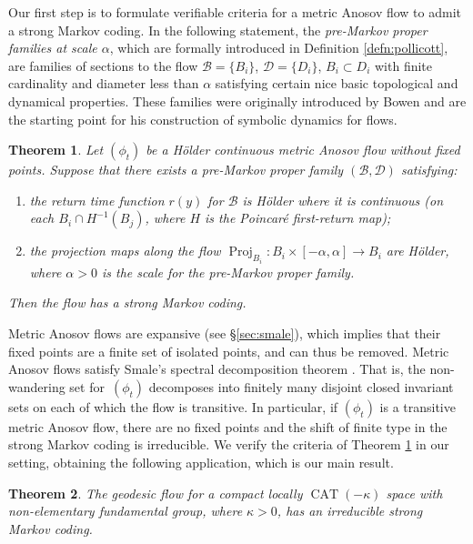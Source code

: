 \documentclass[JEP,XML,SOM,Unicode,NoFloatCountersInSection]{cedram}
\let\mathcal\mathscr
\newtheorem{thmx}{Theorem}
\theoremstyle{definition}
\numberwithin{equation}{section}
\DeclareMathOperator{\CAT}{CAT}
\DeclareMathOperator{\Proj}{Proj}
\newcommand\DDD{\mathcal D}
\newcommand\BBB{\mathcal B}
\begin{document}
Our first step is to formulate verifiable criteria for a metric Anosov flow to admit a strong Markov coding. In the following statement, the \emph{pre-Markov proper families at scale $\alpha$}, which are formally introduced in Definition \ref{defn:pollicott}, are families of sections to the flow $\BBB=\{B_i\}$, $\DDD=\{D_i\}$, $B_i \subset D_i$ with finite cardinality and diameter less than $\alpha$ satisfying certain nice basic topological and dynamical properties. These families were originally introduced by Bowen and are the starting point for his construction of symbolic dynamics for flows.
\begin{thmx} \label{t.usefulversion}
Let $(\phi_t)$ be a Hölder continuous metric Anosov flow without fixed points. Suppose that there exists a pre-Markov proper family $(\BBB, \DDD)$ satisfying:
\begin{enumerate}
\item\label{t.usefulversion1} the return time function $r(y)$ for $\BBB$ is Hölder where it is continuous (\ie on each $B_i \cap H^{-1}(B_j)$, where $H$ is the Poincaré first-return map);

\item\label{t.usefulversion2} the projection maps along the flow $\Proj_{B_{i}}: B_i \times [-\alpha, \alpha] \to B_i$ are Hölder, where $\alpha>0$ is the scale for the pre-Markov proper family.
\end{enumerate}
Then the flow has a strong Markov coding.
\end{thmx}
Metric Anosov flows are expansive (see \S \ref{sec:smale}), which implies that their fixed points are a finite set of isolated points, and can thus be removed. Metric Anosov flows satisfy Smale's spectral decomposition theorem \cite{pollicott}. That is, the non-wandering set for~$(\phi_t)$ decomposes into finitely many disjoint closed invariant sets on each of which the flow is transitive. In particular, if $(\phi_t)$ is a transitive metric Anosov flow, there are no fixed points and the shift of finite type in the strong Markov coding is irreducible. We verify the criteria of Theorem \ref{t.usefulversion} in our setting, obtaining the following application, which is our main result.

\begin{thmx} \label{t.main}
The geodesic flow for a compact locally $\CAT(-\kappa)$ space with non-elementary fundamental group, where $\kappa>0$, has an irreducible strong Markov coding.
\end{thmx}
\end{document}
